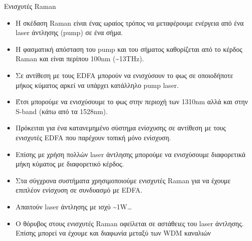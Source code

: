 \documentclass[11pt,aspectratio=169]{beamer}
\begin{document}
\begin{frame}[shrink=20,t]{Ενισχυτές Raman}
\begin{itemize}
\item Η σκέδαση Raman είναι ένας ωραίος τρόπος να μεταφέρουμε ενέργεια από ένα laser άντλησης (pump) σε ένα σήμα.
\item Η φασματική απόσταση του pump και του σήματος καθορίζεται από το κέρδος Raman και είναι περίπου 100nm (\textasciitilde{}13THz).
\item Σε αντίθεση με τους EDFA μπορούν να ενισχύσουν το φως σε οποιοδήποτε μήκος κύματος αρκεί να υπάρχει κατάλληλο pump laser.
\item Έτσι μπορούμε να ενισχύσουμε το φως στην περιοχή των 1310nm αλλά και στην S-band (κάτω από τα 1528nm).
\item Πρόκειται για ένα κατανεμημένο σύστημα ενίσχυσης σε αντίθεση με τους ενισχυτές EDFA που παρέχουν τοπική μόνο ενίσχυση.
\item Επίσης με χρήση πολλών laser άντλησης μπορούμε να ενισχύσουμε διαφορετικά μήκη κύματος με διαφορετικό κέρδος.
\item Στα σύγχρονα συστήματα χρησιμοποιούμε ενισχυτές Raman για να έχουμε επιπλέον ενίσχυση σε συνδυασμό με EDFA.
\item Aπαιτούν laser άντλησης με ισχύ \textasciitilde{}1W…
\item O θόρυβος στους ενισχυτές Raman οφείλεται σε αστάθειες του laser άντλησης. Επίσης μπορεί να έχουμε και διαφωνία μεταξύ των WDM καναλιών
\end{itemize}
\end{frame}
\end{document}
